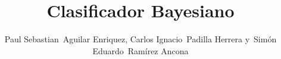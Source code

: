 \documentclass[10pt,journal,compsoc]{IEEEtran}
\begin{document}
%
\title{Clasificador Bayesiano}
%
%
%
%

\author{Paul Sebastian~Aguilar Enriquez,
        Carlos Ignacio~Padilla Herrera
        y~Simón Eduardo~Ramírez Ancona%
}

% 
%
\end{document}
